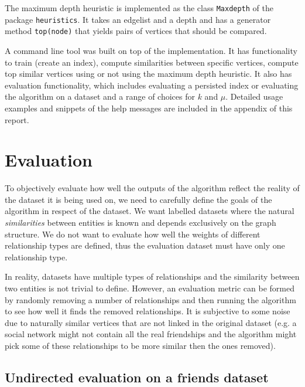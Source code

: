 \documentclass[12pt]{report}
\begin{document}
The maximum depth heuristic is implemented as the class {\tt Maxdepth} of the
package {\tt heuristics}. It takes an edgelist and a depth and has a generator
method {\tt top(node)} that yields pairs of vertices that should be compared.

A command line tool was built on top of the implementation. It has functionality
to train (create an index), compute similarities between specific vertices,
compute top similar vertices using or not using the maximum depth heuristic. It
also has evaluation functionality, which includes evaluating a persisted index
or evaluating the algorithm on a dataset and a range of choices for $k$ and $\mu$.
Detailed usage examples and snippets of the help messages are included in the
appendix of this report.

%
%
\section{Evaluation}

To objectively evaluate how well the outputs of the algorithm reflect the reality
of the dataset it is being used on, we need to carefully define the goals of the
algorithm in respect of the dataset. We want labelled datasets where the natural
\textit{similarities} between entities is known and depends exclusively on the
graph structure. We do not want to evaluate how well the weights of different
relationship types are defined, thus the evaluation dataset must have only one
relationship type.

In reality, datasets have multiple types of relationships and the similarity
between two entities is not trivial to define. However, an evaluation metric can
be formed by randomly removing a number of relationships and then running the
algorithm to see how well it finds the removed relationships. It is subjective
to some noise due to naturally similar vertices that are not linked in the
original dataset (e.g. a social network might not contain all the real
friendships and the algorithm might pick some of these relationships to be more
similar then the ones removed).


\subsection{Undirected evaluation on a friends dataset}
\end{document}
